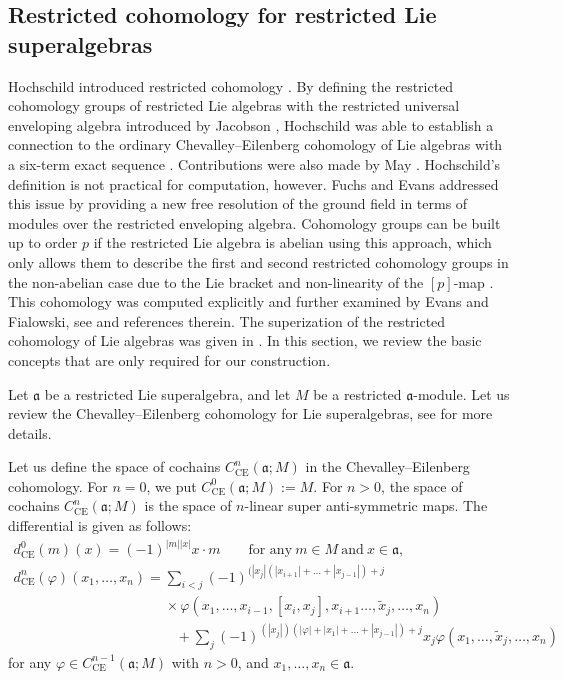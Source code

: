 \documentclass[10pt,a4paper]{amsart}
\numberwithin{equation}{section}
\begin{document}
\subsection{Restricted cohomology for restricted Lie superalgebras}
Hochschild introduced restricted cohomology \cite{H}. By defining the restricted cohomology groups of restricted Lie algebras with the restricted universal enveloping algebra introduced by Jacobson \cite{J}, Hochschild was able to establish a connection to the ordinary Chevalley--Eilenberg cohomology of Lie algebras with a six-term exact sequence \cite{H}. Contributions were also made by May \cite{M}. Hochschild's definition is not practical for computation, however.
Fuchs and Evans addressed this issue by providing a new free resolution of the ground field in terms of modules over the restricted enveloping algebra. Cohomology groups can be built up to order $p$ if the restricted Lie algebra is abelian using this approach, which only allows them to describe the first and second restricted cohomology groups in the non-abelian case due to the Lie bracket and non-linearity of the $[p]$-map \cite{EF}. This cohomology was computed explicitly and further examined by Evans and Fialowski, see \cite{EF4, EF5} and references therein. The superization of the restricted cohomology of Lie algebras was given in \cite{YCC}. In this section, we review the basic concepts that are only required for our construction.

Let $\mathfrak{a}$ be a restricted Lie superalgebra, and let $M$ be a restricted $\mathfrak{a}$-module. Let us review the Chevalley--Eilenberg cohomology for Lie superalgebras, see \cite{BGL} for more details.

Let us define the space of cochains $C^n_{\text{CE}}(\mathfrak{a}; M)$ in the Chevalley--Eilenberg cohomology. For ${n=0}$, we put $C^0_{\text{CE}}(\mathfrak{a}; M):=M$. For $n>0$, the space of cochains $C^n_{\text{CE}}(\mathfrak{a}; M)$ is the space of $n$-linear super anti-symmetric maps. The differential is given as follows:
\begin{gather*}
 d_{\mathrm{CE}}^0(m)(x)=(-1)^{|m||x|}x\cdot m\qquad\text{for any}\ m\in M\ \text{and} \ x\in\mathfrak{a},\\
d_{\mathrm{CE}}^n(\varphi)(x_1,\dots, x_n) = \mathop{\sum}\limits_{i<j}(-1)^{(|x_j|(|x_{i+1}|+\dots+|x_{j-1}|)+j}\\
\phantom{d_{\mathrm{CE}}^n(\varphi)(x_1,\dots, x_n) =}{}\times\varphi(x_1, \dots, x_{i-1}, [x_i,x_j], x_{i+1} \dots, \widetilde x_j, \dots, x_n)\\
\phantom{d_{\mathrm{CE}}^n(\varphi)(x_1,\dots, x_n) =\times}{}+\mathop{\sum}\limits_{j}(-1)^{(|x_j|)(|\varphi|+|x_{1}|+\dots+|x_{j-1}|)+j}x_j  \varphi (x_1, \dots, \widetilde x_j, \dots, x_n)
\end{gather*}
for any $\varphi \in C^{n-1}_{\text{CE}}(\mathfrak{a}; M)$ with $n>0$, and $x_1,\dots, x_n\in\mathfrak{a}$.
\end{document}
